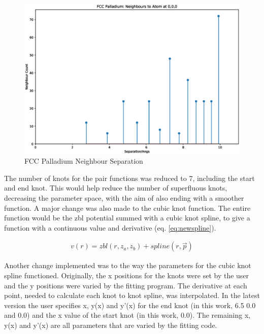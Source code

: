\begin{figure}[htp]
  \begin{center}
    \includegraphics[scale=0.55]{chapters/results_potential_fitting/neighbours/pd.eps}
    \caption{FCC Palladium Neighbour Separation}
    \label{fig:fcc-pd-neighbours}
  \end{center}
\end{figure}

The number of knots for the pair functions was reduced to 7, including the start and end knot.  This would help reduce the number of superfluous knots, decreasing the parameter space, with the aim of also ending with a smoother function.  A major change was also made to the cubic knot function.  The entire function would be the \acrshort{zbl} potential summed with a cubic knot spline, to give a function with a continuous value and derivative (eq. \ref{eq:newspline}).

\begin{equation}
\begin{split}
v(r) = zbl(r, z_a, z_b) + spline(r, \vec{p})
\end{split}
\label{eq:newspline}
\end{equation}

Another change implemented was to the way the parameters for the cubic knot spline functioned.  Originally, the x positions for the knots were set by the user and the y positions were varied by the fitting program.  The derivative at each point, needed to calculate each knot to knot spline, was interpolated.  In the latest version the user specifies x, y(x) and y'(x) for the end knot (in this work, 6.5 0.0 and 0.0) and the x value of the start knot (in this work, 0.0).  The remaining x, y(x) and y'(x) are all parameters that are varied by the fitting code.

